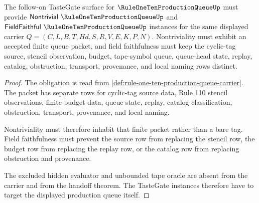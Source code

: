 \begin{theorem}
\label{thm:rule-one-ten-production-queue-tastegate-obligation}
The follow-on TasteGate surface for $\RuleOneTenProductionQueueUp$ must provide $\mathsf{Nontrivial}\ \RuleOneTenProductionQueueUp$ and $\mathsf{FieldFaithful}\ \RuleOneTenProductionQueueUp$ instances for the same displayed carrier $Q=(C,L,B,T,Hd,S,R,V,E,K,P,N)$. Nontriviality must exhibit an accepted finite queue packet, and field faithfulness must keep the cyclic-tag source, stencil observation, budget, tape-symbol queue, queue-head state, replay, catalog, obstruction, transport, provenance, and local naming rows distinct.
\end{theorem}
\begin{proof}
The obligation is read from \autoref{def:rule-one-ten-production-queue-carrier}. The packet has separate rows for cyclic-tag source data, Rule 110 stencil observations, finite budget data, queue state, replay, catalog classification, obstruction, transport, provenance, and local naming.

Nontriviality must therefore inhabit that finite packet rather than a bare tag. Field faithfulness must prevent the source row from replacing the stencil row, the budget row from replacing the replay row, or the catalog row from replacing obstruction and provenance.

The excluded hidden evaluator and unbounded tape oracle are absent from the carrier and from the handoff theorem. The TasteGate instances therefore have to target the displayed production queue itself.
\end{proof}


\begin{closurestatus}{\RuleOneTenProductionQueueUp}
  \theoryclosure{\seedClosure}
  \formalstatus{\unformalizedV}
\end{closurestatus}
